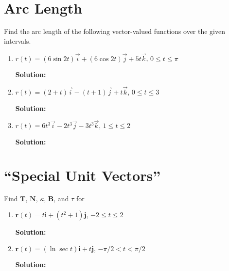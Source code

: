 \documentclass[letterpaper, 11pt]{article}
\begin{document}
\section{Arc Length}
Find the arc length of the following vector-valued functions over the given intervals.
\begin{enumerate}[label= (\alph*)]
\item $r(t)= (6\sin2t)\vec i+(6\cos2t)\vec j+5t\vec k$, $0\leq t \leq \pi$
\par \textbf{Solution:}


\item $r(t)=(2+t)\vec i-(t+1)\vec j+t\vec k$, $0\leq t \leq 3$
\par \textbf{Solution:}


\item $r(t) = 6t^3\vec i - 2t^3 \vec j - 3t^3 \vec k$, $1 \leq t \leq 2$
\par \textbf{Solution:}


\end{enumerate}

\section{``Special Unit Vectors''}
Find $\bm{T}$, $\bm{N}$, $\kappa$, $\bm{B}$, and $\tau$ for
\begin{enumerate}[label=(\alph*)]
\item $\bm{r}(t) = t \bm{i} + (t^2+1) \bm{j}$, $ -2 \leq t \leq 2$
\par \textbf{Solution:}


\item $\bm{r}(t)= (\ln\sec t)\bm{i}+t\bm{j}$, $-\pi/2<t<\pi/2$
\par \textbf{Solution:}


\end{enumerate}

\end{document}

